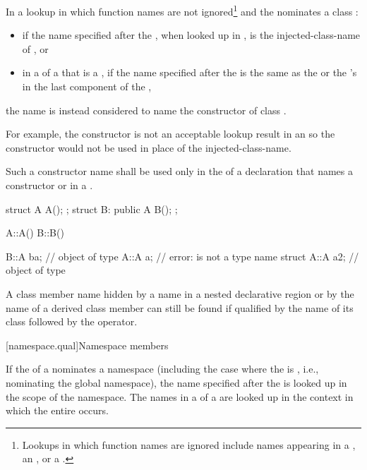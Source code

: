 \pnum
In a lookup in which function names are not ignored\footnote{Lookups in which
function names are ignored include names appearing in a
, an
, or a .}
and the  nominates a class :
\begin{itemize}
\item if the name specified after the ,
when looked up in , is the injected-class-name of , or
\item
in a  of
a  that is a ,
if the name specified after the  is the same as the
 or the 's
 in the last component of the ,
\end{itemize}
the name is instead considered to name the
constructor of class .
\begin{note}
For example, the constructor
is not an acceptable lookup result in an
 so the constructor would not be
used in place of the injected-class-name.
\end{note}
Such a constructor
name shall be used only in the  of a declaration
that names a constructor or in a .
\begin{example}
\begin{codeblock}
struct A { A(); };
struct B: public A { B(); };

A::A() { }
B::B() { }

B::A ba;            // object of type 
A::A a;             // error:  is not a type name
struct A::A a2;     // object of type 
\end{codeblock}
\end{example}

\pnum
A class member name hidden by a name in a nested declarative region or
by the name of a derived class member can still be found if qualified by
the name of its class followed by the \tcode{::} operator.

[namespace.qual]{Namespace members}

\pnum
{}%
If the  of a 
nominates a namespace (including the case where the
 is \tcode{::}, i.e., nominating
the global namespace), the name specified after the
 is looked up in the scope of the
namespace.
The names in a  of a
 are looked up in the context in which the
entire  occurs.

